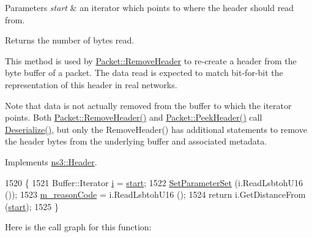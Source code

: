 \begin{DoxyParams}{Parameters}
{\em start} & an iterator which points to where the header should read from. \\
\hline
\end{DoxyParams}
\begin{DoxyReturn}{Returns}
the number of bytes read.
\end{DoxyReturn}
This method is used by \hyperlink{classns3_1_1Packet_a0961eccf975d75f902d40956c93ba63e}{Packet\+::\+Remove\+Header} to re-\/create a header from the byte buffer of a packet. The data read is expected to match bit-\/for-\/bit the representation of this header in real networks.

Note that data is not actually removed from the buffer to which the iterator points. Both \hyperlink{classns3_1_1Packet_a0961eccf975d75f902d40956c93ba63e}{Packet\+::\+Remove\+Header()} and \hyperlink{classns3_1_1Packet_aadc63487bea70945c418f4c3e9b81964}{Packet\+::\+Peek\+Header()} call \hyperlink{classns3_1_1MgtDelBaHeader_a69d8934b2ba8529288d0f8797c16e0fb}{Deserialize()}, but only the Remove\+Header() has additional statements to remove the header bytes from the underlying buffer and associated metadata. 

Implements \hyperlink{classns3_1_1Header_a78be9400bb66b2a8543606f395ef5396}{ns3\+::\+Header}.


\begin{DoxyCode}
1520 \{
1521   Buffer::Iterator \hyperlink{bernuolliDistribution_8m_a6f6ccfcf58b31cb6412107d9d5281426}{i} = \hyperlink{namespacevisualizer_1_1core_a2a35e5d8a34af358b508dac8635754e0}{start};
1522   \hyperlink{classns3_1_1MgtDelBaHeader_a6dfc58eded28a549ec428363da3b600c}{SetParameterSet} (i.ReadLsbtohU16 ());
1523   \hyperlink{classns3_1_1MgtDelBaHeader_aa2cf808419b9cc867bc97943b96e8db9}{m\_reasonCode} = i.ReadLsbtohU16 ();
1524   \textcolor{keywordflow}{return} i.GetDistanceFrom (\hyperlink{namespacevisualizer_1_1core_a2a35e5d8a34af358b508dac8635754e0}{start});
1525 \}
\end{DoxyCode}


Here is the call graph for this function\+:


